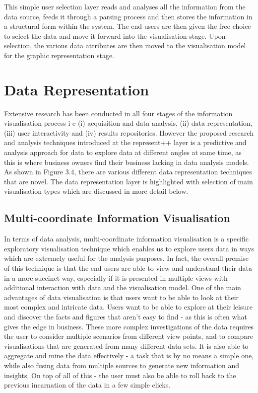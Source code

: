 This simple user selection layer reads and analyses all the information from the data source, feeds it through a parsing process and then stores the information in a structural form within the system. The end users are then given the free choice to select the data and move it forward into the visualisation stage. Upon selection, the various data attributes are then moved to the visualisation model for the graphic representation stage.

\section{Data Representation}

Extensive research has been conducted in all four stages of the information visualisation process i-e (i) acquisition and data analysis, (ii) data representation, (iii) user interactivity and (iv) results repositories. However the proposed research and analysis techniques introduced at the represent++ layer is a predictive and analysis approach for data to explore data at different angles at same time, as this is where business owners find their business lacking in data analysis models. As shown in Figure 3.4, there are various different data representation techniques that are novel. The data representation layer is highlighted with selection of main visualisation types which are discussed in more detail below.

\subsection{Multi-coordinate Information Visualisation}

In terms of data analysis, multi-coordinate information visualisation is a specific exploratory visualisation technique which enables us to explore users data in ways which are extremely useful for the analysis purposes. In fact, the overall premise of this technique is that the end users are able to view and understand their data in a more succinct way, especially if it is presented in multiple views with additional interaction with data and the visualisation model. One of the main advantages of data visualisation is that users want to be able to look at their most complex and intricate data. Users want to be able to explore at their leisure and discover the facts and figures that aren't easy to find - as this is often what gives the edge in business. These more complex investigations of the data requires the user to consider multiple scenarios from different view points, and to compare visualisations that are generated from many different data sets. It is also able to aggregate and mine the data effectively - a task that is by no means a simple one, while also fusing data from multiple sources to generate new information and insights. On top of all of this - the user must also be able to roll back to the previous incarnation of the data in a few simple clicks.

